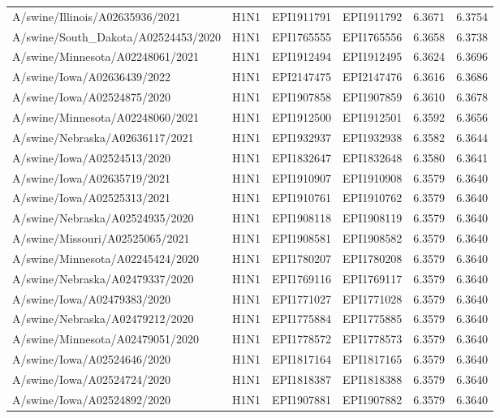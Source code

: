\begin{tabular}{L{1.95in}|L{.25in}|L{.60in}|L{.6in}|C{1in}|C{1in}}
 A/swine/Illinois/A02635936/2021 &H1N1&EPI1911791&EPI1911792&6.3671&6.3754\\
 A/swine/South\_Dakota/A02524453/2020 &H1N1&EPI1765555&EPI1765556&6.3658&6.3738\\
 A/swine/Minnesota/A02248061/2021 &H1N1&EPI1912494&EPI1912495&6.3624&6.3696\\
 A/swine/Iowa/A02636439/2022 &H1N1&EPI2147475&EPI2147476&6.3616&6.3686\\
 A/swine/Iowa/A02524875/2020 &H1N1&EPI1907858&EPI1907859&6.3610&6.3678\\
 A/swine/Minnesota/A02248060/2021 &H1N1&EPI1912500&EPI1912501&6.3592&6.3656\\
 A/swine/Nebraska/A02636117/2021 &H1N1&EPI1932937&EPI1932938&6.3582&6.3644\\
 A/swine/Iowa/A02524513/2020 &H1N1&EPI1832647&EPI1832648&6.3580&6.3641\\
 A/swine/Iowa/A02635719/2021 &H1N1&EPI1910907&EPI1910908&6.3579&6.3640\\
 A/swine/Iowa/A02525313/2021 &H1N1&EPI1910761&EPI1910762&6.3579&6.3640\\
 A/swine/Nebraska/A02524935/2020 &H1N1&EPI1908118&EPI1908119&6.3579&6.3640\\
 A/swine/Missouri/A02525065/2021 &H1N1&EPI1908581&EPI1908582&6.3579&6.3640\\
 A/swine/Minnesota/A02245424/2020 &H1N1&EPI1780207&EPI1780208&6.3579&6.3640\\
 A/swine/Nebraska/A02479337/2020 &H1N1&EPI1769116&EPI1769117&6.3579&6.3640\\
 A/swine/Iowa/A02479383/2020 &H1N1&EPI1771027&EPI1771028&6.3579&6.3640\\
 A/swine/Nebraska/A02479212/2020 &H1N1&EPI1775884&EPI1775885&6.3579&6.3640\\
 A/swine/Minnesota/A02479051/2020 &H1N1&EPI1778572&EPI1778573&6.3579&6.3640\\
 A/swine/Iowa/A02524646/2020 &H1N1&EPI1817164&EPI1817165&6.3579&6.3640\\
 A/swine/Iowa/A02524724/2020 &H1N1&EPI1818387&EPI1818388&6.3579&6.3640\\
 A/swine/Iowa/A02524892/2020 &H1N1&EPI1907881&EPI1907882&6.3579&6.3640\\

\end{tabular}
